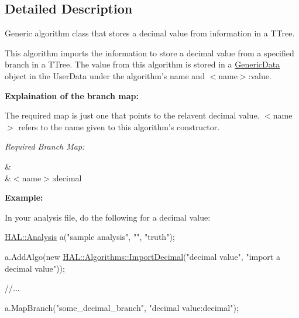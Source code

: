 \subsection{Detailed Description}
Generic algorithm class that stores a decimal value from information in a T\-Tree. 

This algorithm imports the information to store a decimal value from a specified branch in a T\-Tree. The value from this algorithm is stored in a \hyperlink{class_h_a_l_1_1_generic_data}{Generic\-Data} object in the User\-Data under the algorithm's name and $<$name$>$\-:value.\par
\par
 {\bfseries Explaination of the branch map\-:}\par
 The required map is just one that points to the relavent decimal value. $<$name$>$ refers to the name given to this algorithm's constructor.\par
 {\itshape Required Branch Map\-:} \begin{TabularC}{2}
\hline
{}&\PBS{}\\
&\PBS\centering $<$name$>$\-:decimal \\
\end{TabularC}
{\bfseries Example\-:}\par
 In your analysis file, do the following for a decimal value\-:


\begin{DoxyCode}
\hyperlink{class_h_a_l_1_1_analysis}{HAL::Analysis} a(\textcolor{stringliteral}{"sample analysis"}, \textcolor{stringliteral}{""}, \textcolor{stringliteral}{"truth"});

a.AddAlgo(\textcolor{keyword}{new} \hyperlink{class_h_a_l_1_1_algorithms_1_1_import_decimal}{HAL::Algorithms::ImportDecimal}(\textcolor{stringliteral}{"decimal value"}, \textcolor{stringliteral}{"import a
       decimal value"}));

\textcolor{comment}{//...}

a.MapBranch(\textcolor{stringliteral}{"some\_decimal\_branch"}, \textcolor{stringliteral}{"decimal value:decimal"});
\end{DoxyCode}
 


